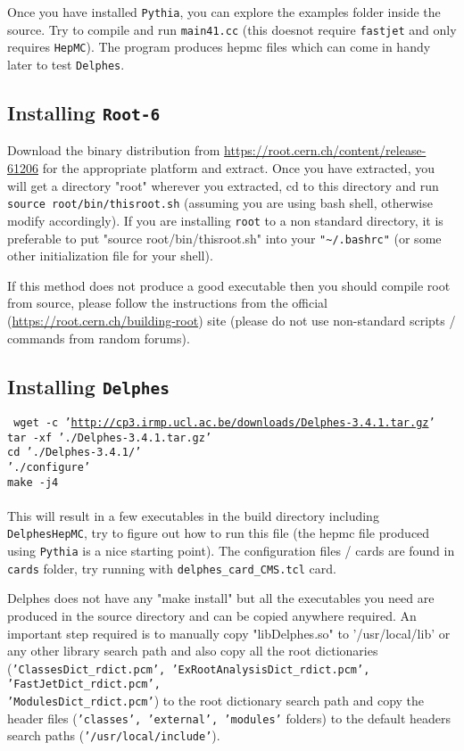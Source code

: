 Once you have installed {\tt Pythia}, you can explore the examples folder inside the source. Try to compile and run {\tt main41.cc} (this doesnot require {\tt fastjet} and only requires {\tt HepMC}). The program produces hepmc files which can come in handy later to test {\tt Delphes}.

\subsection{Installing {\tt Root-6}}
Download the binary distribution from \url{https://root.cern.ch/content/release-61206} for the appropriate platform and extract.
Once you have extracted, you will get a directory "root" wherever you extracted, cd to this directory and run
{\tt source root/bin/thisroot.sh} (assuming you are using bash shell, otherwise modify accordingly). If you are installing {\tt root} to a non standard directory, it is preferable to put "source root/bin/thisroot.sh" into your {\tt "\textasciitilde{}/.bashrc"} (or some other initialization file for your shell).

If this method does not produce a good executable then you should compile root from source, please follow the instructions from the official (\url{https://root.cern.ch/building-root}) site (please do not use non-standard scripts / commands from random forums).

\subsection{Installing {\tt Delphes}}
{\tt
	wget -c '\url{http://cp3.irmp.ucl.ac.be/downloads/Delphes-3.4.1.tar.gz}'\\
	tar -xf './Delphes-3.4.1.tar.gz'\\
	cd './Delphes-3.4.1/'\\
	'./configure'\\
	make -j4\\	
}\\

This will result in a few executables in the build directory including {\tt DelphesHepMC}, try to figure out how to run this file (the hepmc file produced using {\tt Pythia} is a nice starting point). The configuration files / cards are found in {\tt cards} folder, try running with {\tt delphes\_card\_CMS.tcl} card.

Delphes does not have any "make install" but all the executables you need are produced in the source directory and can be copied anywhere required.
An important step required is to manually copy "libDelphes.so" to '/usr/local/lib' or any other library search path and also copy all the root dictionaries
({\tt 'ClassesDict\_rdict.pcm', 'ExRootAnalysisDict\_rdict.pcm', 'FastJetDict\_rdict.pcm',\\ 'ModulesDict\_rdict.pcm'}) to the root dictionary search path and copy the header files ({\tt 'classes', 'external', 'modules'} folders) to the default headers search paths ({\tt '/usr/local/include'}).

